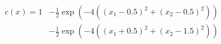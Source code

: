 \documentclass[12pt]{article}
\begin{document}
\begin{align*}
  c(x) = 1 &- \frac{1}{2}  \exp\left( -4 ((x_1 - 0.5)^2 + (x_2 - 0.5)^2)\right) \\
  &- \frac{1}{2}  \exp\left( -4 ((x_1 + 0.5)^2 + (x_2 - 1.5)^2)\right)
\end{align*}
\end{document}
